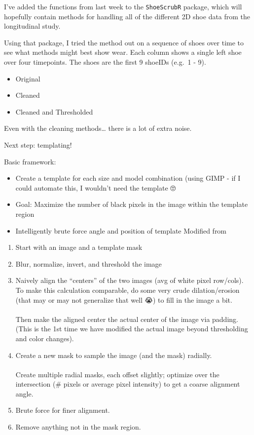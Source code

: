 \documentclass[]{book}
\begin{document}
I've added the functions from last week to the \texttt{ShoeScrubR} package, which will hopefully contain methods for handling all of the different 2D shoe data from the longitudinal study.

Using that package, I tried the method out on a sequence of shoes over time to see what methods might best show wear. Each column shows a single left shoe over four timepoints. The shoes are the first 9 shoeIDs (e.g.~1 - 9).

\begin{itemize}
\item
  Original
\item
  Cleaned\\
\item
  Cleaned and Thresholded
\end{itemize}

Even with the cleaning methods\ldots{} there is a lot of extra noise.

Next step: templating!

Basic framework:

\begin{itemize}
\item
  Create a template for each size and model combination
  (using GIMP - if I could automate this, I wouldn't need the template 🙄
\item
  Goal: Maximize the number of black pixels in the image within the template region
\item
  Intelligently brute force angle and position of template
  Modified from \citet{kimGrayscaleTemplateMatchingInvariant2007}
\end{itemize}

\begin{enumerate}
\def\labelenumi{\arabic{enumi}.}
\item
  Start with an image and a template mask
\item
  Blur, normalize, invert, and threshold the image\\
\item
  Naively align the ``centers'' of the two images (avg of white pixel row/cols). To make this calculation comparable, do some very crude dilation/erosion (that may or may not generalize that well 😭) to fill in the image a bit.\\
  ~\\
  Then make the aligned center the actual center of the image via padding. (This is the 1st time we have modified the actual image beyond thresholding and color changes).
\item
  Create a new mask to sample the image (and the mask) radially.\\
  ~\\
  Create multiple radial masks, each offset slightly; optimize over the intersection (\# pixels or average pixel intensity) to get a coarse alignment angle.
\item
  Brute force for finer alignment.
\item
  Remove anything not in the mask region.
\end{enumerate}
\end{document}

